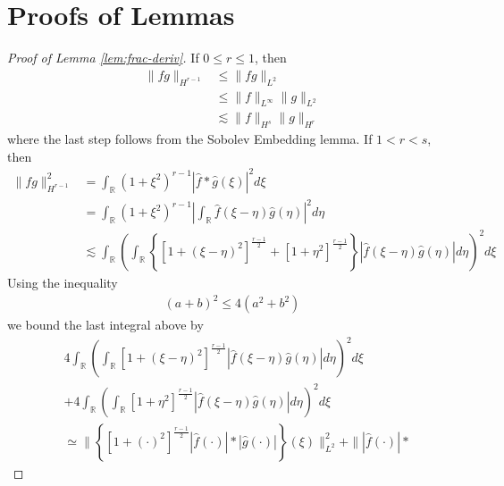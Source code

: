 \documentclass[12pt,reqno]{amsart}
\numberwithin{equation}{section}  %
\newcommand{\rr}{\mathbb{R}}
\newcommand{\wh}{\widehat}
\begin{document}
\section{Proofs of Lemmas} 
\label{sec:pf-lemmas}
%
%
%
\begin{proof}[Proof of Lemma \ref{lem:frac-deriv}]
If $0 \le r \le 1$, then
%
%
\begin{equation*}
\begin{split}
  \| fg \|_{H^{r-1}}
  & \le \| fg \|_{L^{2}}
  \\
  & \le \| f \|_{L^{\infty}} \| g \|_{L^{2}}
  \\
  & \lesssim \| f \|_{H^{s}} \| g \|_{H^{r}}
\end{split}
\end{equation*}
%
%
where the last step follows from the Sobolev Embedding lemma. If $1 < r < s$,
then
%
%
\begin{equation*}
\begin{split}
  \| fg \|_{H^{r-1}}^{2}
  & = \int_{\rr} (1 + \xi^{2})^{r-1} | \wh{f} *
  \wh{g}(\xi) |^{2} d \xi
  \\
  & =  \int_{\rr} (1 + \xi^{2})^{r-1} | \int_{\rr} \wh{f}(\xi - \eta)
  \wh{g}(\eta) |^{2} d \eta
  \\
  & \lesssim \int_{\rr} \left( \int_{\rr} \left\{ \left[ 1 + (\xi - 
  \eta)^{2} \right]^{\frac{r-1}{2}} + \left[ 1 + \eta^{2}
  \right]^{\frac{r-1}{2}} \right\} | \wh{f}(\xi - \eta) \wh{g}(\eta) | d \eta
  \right)^{2} d \xi
\end{split}
\end{equation*}
%
Using the inequality
%
%
\begin{equation*}
\begin{split}
  (a + b)^{2} \le 4(a^{2} + b^{2})
\end{split}
\end{equation*}
%
%
we bound the last integral above by
%
%
\begin{equation*}
\begin{split}
  & 4 \int_{\rr} \left( \int_{\rr} \left[ 1 + (\xi - 
  \eta)^{2} \right]^{\frac{r-1}{2}} | \wh{f}(\xi - \eta) \wh{g}(\eta) | d \eta
  \right)^{2} d \xi
  \\
  & +  4 \int_{\rr} \left( \int_{\rr} 
  \left[ 1 + \eta^{2} \right]^{\frac{r-1}{2}} 
  | \wh{f}(\xi - \eta) \wh{g}(\eta) | d \eta
  \right)^{2} d \xi
  \\ 
  & \simeq \| \left\{ \left[ 1 + (\cdot)^{2} \right]^{\frac{r-1}{2}} |
  \wh{f}(\cdot)
  | * | \wh{g}(\cdot) | \right\}(\xi) \|_{L^{2}}^{2} + \| | \wh{f}(\cdot) |*

\end{split}
\end{equation*}
\end{proof}
\end{document}
